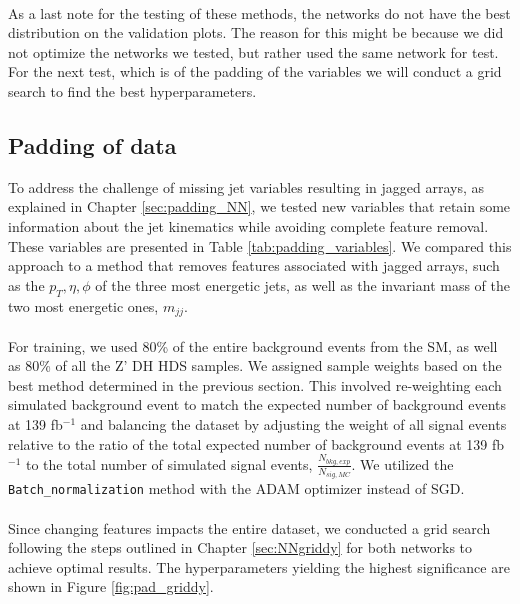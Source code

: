\documentclass[12pt, a4paper]{book}
\begin{document}
\\As a last note for the testing of these methods, the networks do not have the best distribution on the validation plots. The reason for this might be because 
we did not optimize the networks we tested, but rather used the same network for test. For the next test, which is of the padding of the variables we will conduct a grid search to find the best hyperparameters.
\clearpage


\subsection{Padding of data}\label{sec:padding_NN_res}
To address the challenge of missing jet variables resulting in jagged arrays, as explained in Chapter \ref{sec:padding_NN}, we tested new variables that retain some information about the jet kinematics while 
avoiding complete feature removal. These variables are presented in Table \ref{tab:padding_variables}. We compared this approach to a method that removes features associated with jagged arrays, 
such as the $p_T, \eta, \phi$ of the three most energetic jets, as well as the invariant mass of the two most energetic ones, $m_{jj}$. \\
\\For training, we used 80\% of the entire background events from the SM, as well as 80\% of all the Z' DH HDS samples. We assigned sample weights based on the best method determined in the previous section. 
This involved re-weighting each simulated background event to match the expected number of background events at 139 fb$^{-1}$ and balancing the dataset by adjusting the weight of all signal events relative 
to the ratio of the total expected number of background events at 139 fb$^{-1}$ to the total number of simulated signal events, $\frac{N_{bkg,exp}}{N_{sig,MC}}$. 
We utilized the \verb|Batch_normalization| method with the ADAM optimizer instead of SGD.\\
\\Since changing features impacts the entire dataset, we conducted a grid search following the steps outlined in Chapter \ref{sec:NNgriddy} for both networks to achieve optimal results. The hyperparameters 
yielding the highest significance are shown in Figure \ref{fig:pad_griddy}.
\graphicspath{{../../Plots/NeuralNetwork/Padding/}}
\end{document}

